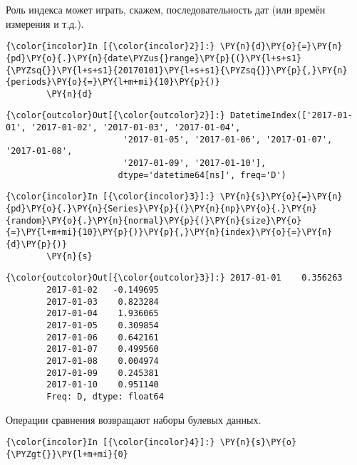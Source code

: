     Роль индекса может играть, скажем, последовательность дат (или времён
измерения и т.д.).

    \begin{Verbatim}[commandchars=\\\{\}]
{\color{incolor}In [{\color{incolor}2}]:} \PY{n}{d}\PY{o}{=}\PY{n}{pd}\PY{o}{.}\PY{n}{date\PYZus{}range}\PY{p}{(}\PY{l+s+s1}{\PYZsq{}}\PY{l+s+s1}{20170101}\PY{l+s+s1}{\PYZsq{}}\PY{p}{,}\PY{n}{periods}\PY{o}{=}\PY{l+m+mi}{10}\PY{p}{)}
        \PY{n}{d}
\end{Verbatim}

            \begin{Verbatim}[commandchars=\\\{\}]
{\color{outcolor}Out[{\color{outcolor}2}]:} DatetimeIndex(['2017-01-01', '2017-01-02', '2017-01-03', '2017-01-04',
                       '2017-01-05', '2017-01-06', '2017-01-07', '2017-01-08',
                       '2017-01-09', '2017-01-10'],
                      dtype='datetime64[ns]', freq='D')
\end{Verbatim}
        
    \begin{Verbatim}[commandchars=\\\{\}]
{\color{incolor}In [{\color{incolor}3}]:} \PY{n}{s}\PY{o}{=}\PY{n}{pd}\PY{o}{.}\PY{n}{Series}\PY{p}{(}\PY{n}{np}\PY{o}{.}\PY{n}{random}\PY{o}{.}\PY{n}{normal}\PY{p}{(}\PY{n}{size}\PY{o}{=}\PY{l+m+mi}{10}\PY{p}{)}\PY{p}{,}\PY{n}{index}\PY{o}{=}\PY{n}{d}\PY{p}{)}
        \PY{n}{s}
\end{Verbatim}

            \begin{Verbatim}[commandchars=\\\{\}]
{\color{outcolor}Out[{\color{outcolor}3}]:} 2017-01-01    0.356263
        2017-01-02   -0.149695
        2017-01-03    0.823284
        2017-01-04    1.936065
        2017-01-05    0.309854
        2017-01-06    0.642161
        2017-01-07    0.499560
        2017-01-08    0.004974
        2017-01-09    0.245381
        2017-01-10    0.951140
        Freq: D, dtype: float64
\end{Verbatim}
        
    Операции сравнения возвращают наборы булевых данных.

    \begin{Verbatim}[commandchars=\\\{\}]
{\color{incolor}In [{\color{incolor}4}]:} \PY{n}{s}\PY{o}{\PYZgt{}}\PY{l+m+mi}{0}
\end{Verbatim}

